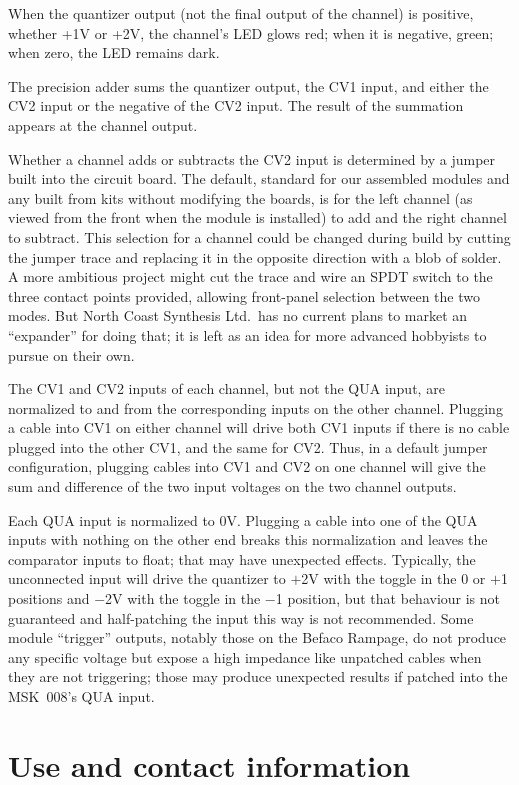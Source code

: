 When the quantizer output (not the final output of the channel) is positive,
whether +1V or +2V, the channel's LED glows red; when it is negative, green;
when zero, the LED remains dark.

The precision adder sums the quantizer output, the CV1 input, and either the
CV2 input or the negative of the CV2 input.  The result of the summation
appears at the channel output.

Whether a channel adds or subtracts the CV2 input is determined by a jumper
built into the circuit board.  The default, standard for our assembled
modules and any built from kits without modifying the boards, is for the
left channel (as viewed from the front when the module is installed) to add
and the right channel to subtract.  This selection for a channel could be
changed during build by cutting the jumper trace and replacing it in the
opposite direction with a blob of solder.  A more ambitious project might
cut the trace and wire an SPDT switch to the three contact points
provided, allowing front-panel selection between the two modes.  But North
Coast Synthesis Ltd.\ has no current plans to market an ``expander'' for
doing that; it is left as an idea for more advanced hobbyists to pursue on
their own.

The CV1 and CV2 inputs of each channel, but not the QUA input, are
normalized to and from the corresponding inputs on the other channel. 
Plugging a cable into CV1 on either channel will drive both CV1 inputs if
there is no cable plugged into the other CV1, and the same for CV2.  Thus,
in a default jumper configuration, plugging cables into CV1 and CV2 on one
channel will give the sum and difference of the two input voltages on the
two channel outputs.

Each QUA input is normalized to 0V.  Plugging a cable into one of the QUA
inputs with nothing on the other end breaks this normalization and leaves
the comparator inputs to float; that may have unexpected effects. 
Typically, the unconnected input will drive the quantizer to $+$2V with the
toggle in the 0 or $+$1 positions and $-$2V with the toggle in the $-$1
position, but that behaviour is not guaranteed and half-patching the input
this way is not recommended.  Some module ``trigger'' outputs, notably those
on the Befaco Rampage, do not produce any specific voltage but expose a
high impedance like unpatched cables when they are not triggering; those
may produce unexpected results if patched into the MSK~008's QUA input.

\section{Use and contact information}

